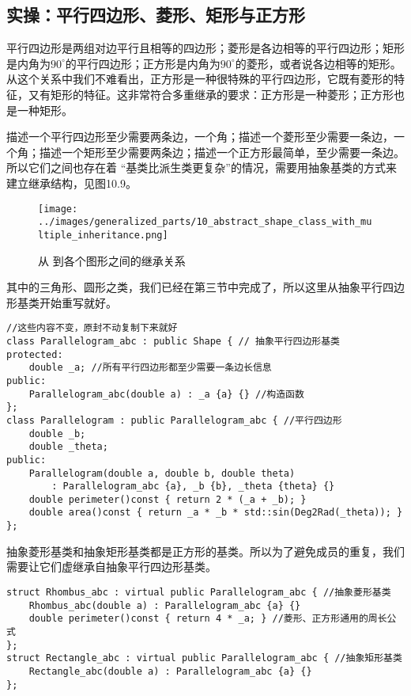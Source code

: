 \subsection*{实操：平行四边形、菱形、矩形与正方形}
平行四边形是两组对边平行且相等的四边形；菱形是各边相等的平行四边形；矩形是内角为$90^\circ$的平行四边形；正方形是内角为$90^\circ$的菱形，或者说各边相等的矩形。从这个关系中我们不难看出，正方形是一种很特殊的平行四边形，它既有菱形的特征，又有矩形的特征。这非常符合多重继承的要求：正方形是一种菱形；正方形也是一种矩形。\par
描述一个平行四边形至少需要两条边，一个角；描述一个菱形至少需要一条边，一个角；描述一个矩形至少需要两条边；描述一个正方形最简单，至少需要一条边。所以它们之间也存在着
``基类比派生类更复杂''的情况，需要用抽象基类的方式来建立继承结构，见图10.9。\par
\begin{figure}[htbp]
    \centering
    \texttt{[image: ../images/generalized\_parts/10\_abstract\_shape\_class\_with\_multiple\_inheritance.png]}
    \caption{从 \lstinline@Shape@ 到各个图形之间的继承关系}
\end{figure}
其中的三角形、圆形之类，我们已经在第三节中完成了，所以这里从抽象平行四边形基类开始重写就好。
\begin{lstlisting}
//这些内容不变，原封不动复制下来就好
class Parallelogram_abc : public Shape { // 抽象平行四边形基类
protected:
    double _a; //所有平行四边形都至少需要一条边长信息
public:
    Parallelogram_abc(double a) : _a {a} {} //构造函数
};
class Parallelogram : public Parallelogram_abc { //平行四边形
    double _b;
    double _theta;
public:
    Parallelogram(double a, double b, double theta)
        : Parallelogram_abc {a}, _b {b}, _theta {theta} {}
    double perimeter()const { return 2 * (_a + _b); }
    double area()const { return _a * _b * std::sin(Deg2Rad(_theta)); }
};
\end{lstlisting}\par
抽象菱形基类和抽象矩形基类都是正方形的基类。所以为了避免成员的重复，我们需要让它们虚继承自抽象平行四边形基类。
\begin{lstlisting}
struct Rhombus_abc : virtual public Parallelogram_abc { //抽象菱形基类
    Rhombus_abc(double a) : Parallelogram_abc {a} {}
    double perimeter()const { return 4 * _a; } //菱形、正方形通用的周长公式
};
struct Rectangle_abc : virtual public Parallelogram_abc { //抽象矩形基类
    Rectangle_abc(double a) : Parallelogram_abc {a} {}
};
\end{lstlisting}\par
